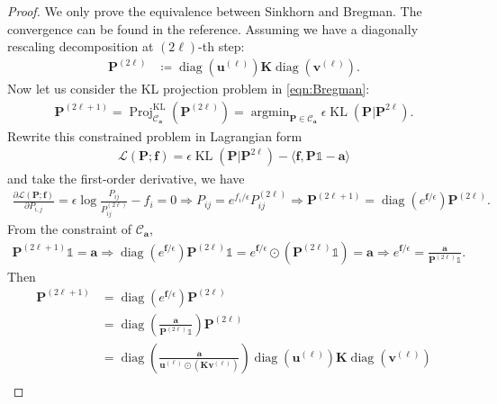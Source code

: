 \documentclass[11pt]{book}
\begin{document}
\begin{proof}
We only prove the equivalence between Sinkhorn and Bregman. The convergence can be found in the reference. Assuming we have a diagonally rescaling decomposition at $(2\ell)$-th step: 
\begin{align*}
    \mathbf{P}^{(2\ell)} &\coloneqq \operatorname{diag}(\mathbf{u}^{(\ell)}) \mathbf{K} \operatorname{diag}(\mathbf{v}^{(\ell)}).
\end{align*}
Now let us consider the KL projection problem in \eqref{eqn:Bregman}:
\begin{align*}
    \mathbf{P}^{(2\ell+1)} = \operatorname{Proj}^{\operatorname{KL}}_{\mathcal{C}_\mathbf{a}} (\mathbf{P}^{(2\ell)}) = \operatorname{argmin}_{\mathbf{P}\in\mathcal{C}_{\mathbf{a}}} \epsilon\operatorname{KL}(\mathbf{P}|\mathbf{P}^{2\ell}).
\end{align*}
Rewrite this constrained problem in Lagrangian form
\begin{align*}
    \mathcal{L}(\mathbf{P};\mathbf{f}) = \epsilon\operatorname{KL}(\mathbf{P}|\mathbf{P}^{2\ell}) - \langle \mathbf{f}, \mathbf{P} \mathbb{1} - \mathbf{a} \rangle
\end{align*}
and take the first-order derivative, we have
\begin{align*}
    \frac{\partial \mathcal{L}(\mathbf{P};\mathbf{f})}{\partial P_{i,j}} =  \epsilon \log \frac{P_{ij}}{P_{ij}^{(2\ell)}} - f_i = 0 
     \Rightarrow  P_{ij} = e^{f_i/\epsilon}P_{ij}^{(2\ell)} 
     \Rightarrow \mathbf{P}^{(2\ell+1)} = \operatorname{diag}(e^{\mathbf{f}/\epsilon})\mathbf{P}^{(2\ell)}.
\end{align*}
From the constraint of $\mathcal{C}_\mathbf{a}$, 
\begin{align*}
    \mathbf{P}^{(2\ell+1)}\mathbb{1}= \mathbf{a} \Rightarrow \operatorname{diag}(e^{\mathbf{f}/\epsilon})\mathbf{P}^{(2\ell)}\mathbb{1} = e^{\mathbf{f}/\epsilon}\odot(\mathbf{P}^{(2\ell)}\mathbb{1}) = \mathbf{a} \Rightarrow 
    e^{\mathbf{f}/\epsilon} = \frac{\mathbf{a}}{\mathbf{P}^{(2\ell)}\mathbb{1}}.
\end{align*}
Then 
\begin{align*}
    \mathbf{P}^{(2\ell+1)} & = \operatorname{diag}(e^{\mathbf{f}/\epsilon})\mathbf{P}^{(2\ell)} \\
    & = \operatorname{diag}\left(\frac{\mathbf{a}}{\mathbf{P}^{(2\ell)}\mathbb{1}}\right)\mathbf{P}^{(2\ell)} \\
    & = \operatorname{diag}\left(\frac{\mathbf{a}}{ \mathbf{u}^{(\ell)} \odot (\mathbf{K} \mathbf{v}^{(\ell)})  }\right) \operatorname{diag}(\mathbf{u}^{(\ell)}) \mathbf{K} \operatorname{diag}(\mathbf{v}^{(\ell)}) \\

\end{align*}
\end{proof}
\end{document}
